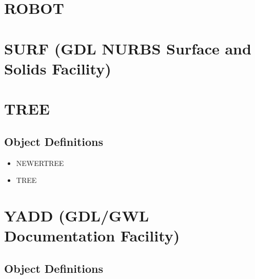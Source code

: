 \documentclass [11pt]{book}
\begin{document}
\section{ROBOT }

\label{sec:robot}







\section{SURF (GDL NURBS Surface and Solids Facility)}

\label{sec:surf(gdlnurbssurfaceandsolidsfacility)}







\section{TREE }

\label{sec:tree}





\subsection{Object Definitions}

\label{subsec:objectdefinitions}



\begin{itemize}

\item {}NEWERTREE

\item {}TREE

\end{itemize}





\section{YADD (GDL/GWL Documentation Facility)}

\label{sec:yadd(gdl/gwldocumentationfacility)}





\subsection{Object Definitions}
\end{document}
